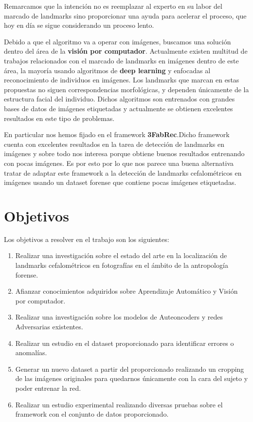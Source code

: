 \noindent Remarcamos que la intención no es reemplazar al experto en su labor del marcado de landmarks sino proporcionar una ayuda para acelerar el proceso, que hoy en día se sigue considerando un proceso lento.

\medskip 

\noindent Debido a que el algoritmo va a operar con imágenes, buscamos una solución dentro del área de la \textbf{visión por computador}. Actualmente existen  multitud de trabajos relacionados con el marcado de landmarks en imágenes dentro de este área, la mayoría usando algoritmos de \textbf{deep learning} y enfocadas al reconocimiento de individuos en imágenes. Los landmarks que marcan en estas propuestas no siguen correspondencias morfológicas, y dependen únicamente de la estructura facial del individuo. Dichos algoritmos son entrenados con grandes bases de datos de imágenes etiquetadas y actualmente se obtienen excelentes resultados en este tipo de problemas.

\medskip

\noindent En particular nos hemos fijado en el framework \textbf{3FabRec}\cite{browatzki20203fabrec}.Dicho framework cuenta con excelentes resultados en la tarea de detección de landmarks en imágenes y sobre todo nos interesa porque obtiene buenos resultados entrenando con pocas imágenes. Es por esto por lo que nos parece una buena alternativa tratar de adaptar este framework a la detección de landmarks cefalométricos en imágenes usando un dataset forense que contiene pocas imágenes etiquetadas.

\section{Objetivos}

\noindent Los objetivos a resolver en el trabajo son los siguientes: 

\begin{enumerate}
    \item Realizar una investigación sobre el estado del arte en la localización de landmarks cefalométricos en fotografías en el ámbito de la antropología forense.
    \item Afianzar conocimientos adquiridos sobre Aprendizaje Automático y Visión por computador.
    \item Realizar una investigación sobre los modelos de Auteoncoders y redes Adversarias existentes.
    \item Realizar un estudio en el dataset proporcionado para identificar errores o anomalías.
    \item Generar un nuevo dataset a partir del proporcionado realizando un cropping de las imágenes originales para quedarnos únicamente con la cara del sujeto y poder entrenar la red.
    \item Realizar un estudio experimental realizando diversas pruebas sobre el framework con el conjunto de datos proporcionado.
\end{enumerate}

